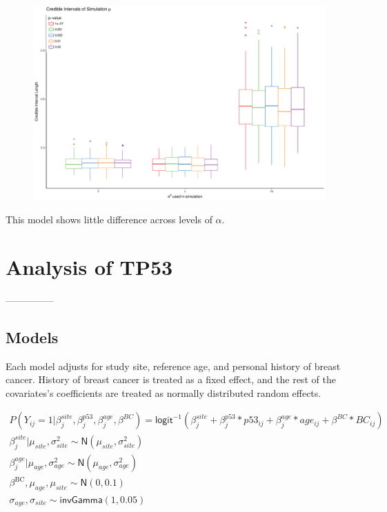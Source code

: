 \documentclass[AMA,STIX1COL]{WileyNJD-v2}\usepackage[]{graphicx}\usepackage[]{color}
\newenvironment{knitrout}{}{} %
\begin{document}
\begin{figure}
\begin{knitrout}
\color{fgcolor}

{\centering \includegraphics[width=6in]{figure/unnamed-chunk-30-1} 

}



\end{knitrout}
\end{figure}
This model shows little difference across levels of $\alpha$.

\section{Analysis of TP53}\label{sec:tp53}
---------------
\subsection{Models}


Each model adjusts for study site, reference age, and personal history of breast cancer. History of breast cancer is treated as a fixed effect, and the rest of the covariates's coefficients are treated as normally distributed random effects. 

\begin{gather}
P(Y_{ij}=1| \beta^{site}_{ j}, \beta^{p53}_{j}, \beta^{age}_{j},\beta^{BC}) = \textsf{logit}^{-1}(\beta^{site}_{ j}+ \beta^{p53}_{j}*p53_{ij}+ \beta^{age}_{j}*age_{ij}+\beta^{BC}* BC_{ij})\\
\beta^{site}_{ j}|\mu_{site}, \sigma_{site}^{2}\sim \textsf{N}(\mu_{site}, \sigma_{site}^{2})\\
\beta^{age}_{j}|\mu_{age}, \sigma^{2}_{age}\sim \textsf{N}(\mu_{age}, \sigma^{2}_{age})\\
\beta^{\text{BC}}, \mu_{age},\mu_{site}\sim \textsf{N}(0,0.1)\\
\sigma_{age},\sigma_{site} \sim \textsf{invGamma}(1, 0.05)
\end{gather}
\end{document}
